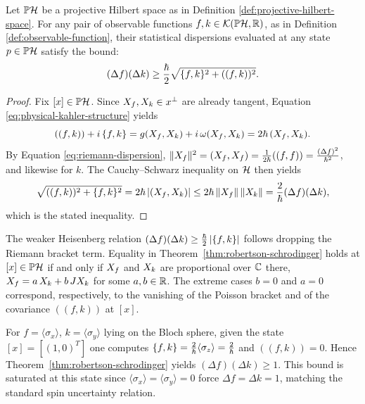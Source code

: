 \begin{theorem}
	\label{thm:robertson-schrodinger}
	Let $\PH$ be a projective Hilbert space as in Definition \ref{def:projective-hilbert-space}. For any pair of observable functions $f,k\in\mathcal{K}(\PH,\R)$, as in Definition \ref{def:observable-function}, their statistical dispersions evaluated at any state $p \in \PH$ satisfy the bound:
	\begin{equation}
		(\Delta f)(\Delta k) \geq \frac{\hbar}{2}\sqrt{\{f,k\}^2 + ((f,k))^2}.
	\end{equation}
\end{theorem}
\begin{proof}
	Fix $[x]\in\PH$. Since $X_{f},X_{k}\in x^\perp$ are already tangent,
	Equation \eqref{eq:physical-kahler-structure} yields
	\begin{equation*}
		((f,k))+i\,\{f,k\} = g(X_{f},X_{k})+i\,\omega(X_{f},X_{k}) = 2\hbar\,(X_{f},X_{k}).
	\end{equation*}
	By Equation \eqref{eq:riemann-dispersion}, $\|X_{f}\|^2=(X_{f},X_{f})=\frac1{2\hbar}((f,f))=\frac{(\Delta f)^2}{\hbar^2}$, and likewise
	for $k$. The Cauchy--Schwarz inequality on $\H$ then yields
	\begin{equation*}
		\sqrt{((f,k))^2+\{f,k\}^2}=2\hbar\,|(X_{f},X_{k})|
		\leq 2\hbar\,\|X_{f}\|\,\|X_{k}\|=\frac2\hbar(\Delta f)(\Delta k),
	\end{equation*}
	which is the stated inequality.
\end{proof}

\begin{remark}
	The weaker Heisenberg relation $(\Delta f)(\Delta k)\geq\frac\hbar2\left|\{f,k\}\right|$
	follows dropping the Riemann bracket term. Equality in
	Theorem~\ref{thm:robertson-schrodinger} holds at $[x]\in\PH$ if and only if
	$X_{f}$ and $X_{k}$ are proportional over $\mathbb{C}$ there, $X_{f}=a\,X_{k}+b\,JX_{k}$ for some $a,b\in\mathbb{R}$. The extreme cases $b=0$ and $a=0$
	correspond, respectively, to the vanishing of the Poisson bracket and of
	the covariance $((f,k))$ at $[x]$.
\end{remark}

\begin{example}
	For $f=\langle\sigma_x\rangle$, $k=\langle\sigma_y\rangle$ lying on the Bloch
	sphere, given the state $[x]=[(1,0)^T]$ one computes
	$\{f,k\}=\tfrac{2}{\hbar}\langle\sigma_z\rangle=\tfrac{2}{\hbar}$
	and $((f,k))=0$. Hence Theorem~\ref{thm:robertson-schrodinger} yields
	$(\Delta f)(\Delta k)\geq 1$. This bound is saturated  at this state since
	$\langle\sigma_x\rangle=\langle\sigma_y\rangle=0$ force
	$\Delta f=\Delta k=1$, matching the standard spin uncertainty relation.
\end{example}

